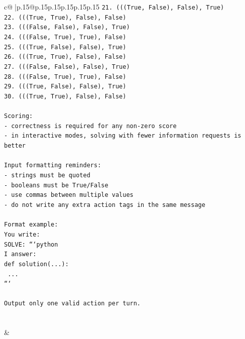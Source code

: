 \documentclass{article}
\begin{document}
{\begin{supertabular}{c@{$\;$}|p{.15\linewidth}@{}p{.15\linewidth}p{.15\linewidth}p{.15\linewidth}p{.15\linewidth}p{.15\linewidth}}
{{{\texttt{21. (((True, False), False), True)} \\
\texttt{22. (((True, True), False), False)} \\
\texttt{23. (((False, False), False), True)} \\
\texttt{24. (((False, True), True), False)} \\
\texttt{25. (((True, False), False), True)} \\
\texttt{26. (((True, True), False), False)} \\
\texttt{27. (((False, False), False), True)} \\
\texttt{28. (((False, True), True), False)} \\
\texttt{29. (((True, False), False), True)} \\
\texttt{30. (((True, True), False), False)} \\
\\ 
\texttt{Scoring:} \\
\texttt{{-} correctness is required for any non{-}zero score} \\
\texttt{{-} in interactive modes, solving with fewer information requests is better} \\
\\ 
\texttt{Input formatting reminders:} \\
\texttt{{-} strings must be quoted} \\
\texttt{{-} booleans must be True/False} \\
\texttt{{-} use commas between multiple values} \\
\texttt{{-} do not write any extra action tags in the same message} \\
\\ 
\texttt{Format example:} \\
\texttt{You write:} \\
\texttt{SOLVE: ```python} \\
\texttt{I answer:} \\
\texttt{def solution(...):} \\
\texttt{    ...} \\
\texttt{```} \\
\\ 
\texttt{Output only one valid action per turn.} \\
            }
        }
    }
     \\ \\

    \theutterance {}  
    & 
\end{supertabular}}
\end{document}
